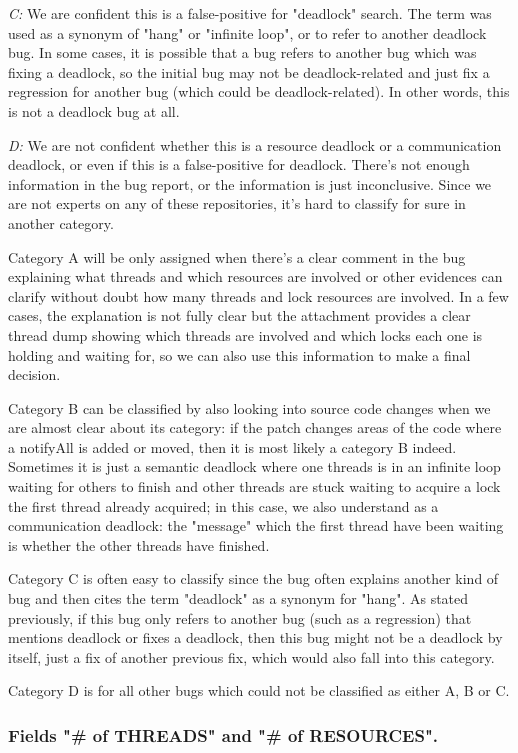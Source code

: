 \emph{C:} We are confident this is a false-positive for "deadlock" search. The term was used as a synonym of "hang" or "infinite loop", or to refer to another deadlock bug. In some cases, it is possible that a bug refers to another bug which was fixing a deadlock, so the initial bug may not be deadlock-related and just fix a regression for another bug (which could be deadlock-related). In other words, this is not a deadlock bug at all.

\emph{D:} We are not confident whether this is a resource deadlock or a communication deadlock, or even if this is a false-positive for deadlock. There's not enough information in the bug report, or the information is just inconclusive. Since we are not experts on any of these repositories, it's hard to classify for sure in another category.

Category A will be only assigned when there's a clear comment in the bug explaining what threads and which resources are involved or other evidences can clarify without doubt how many threads and lock resources are involved. In a few cases, the explanation is not fully clear but the attachment provides a clear thread dump showing which threads are involved and which locks each one is holding and waiting for, so we can also use this information to make a final decision.

Category B can be classified by also looking into source code changes when we are almost clear about its category: if the patch changes areas of the code where a notifyAll is added or moved, then it is most likely a category B indeed. Sometimes it is just a semantic deadlock where one threads is in an infinite loop waiting for others to finish and other threads are stuck waiting to acquire a lock the first thread already acquired; in this case, we also understand as a communication deadlock: the "message" which the first thread have been waiting is whether the other threads have finished.

Category C is often easy to classify since the bug often explains another kind of bug and then cites the term "deadlock" as a synonym for "hang". As stated previously, if this bug only refers to another bug (such as a regression) that mentions deadlock or fixes a deadlock, then this bug might not be a deadlock by itself, just a fix of another previous fix, which would also fall into this category.

Category D is for all other bugs which could not be classified as either A, B or C.


\subsubsection{Fields "\# of THREADS" and "\# of RESOURCES".}

